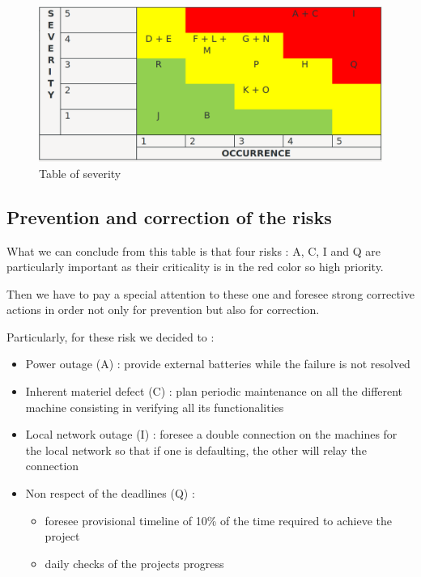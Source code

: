 \begin{figure}[h]
    \centering
    \includegraphics[scale=0.3]{Img/severity.png}
    \caption{Table of severity}
\end{figure}

\subsection{Prevention and correction of the risks}

What we can conclude from this table is that four risks : A, C, I and Q
are particularly important as their criticality is in the red color so
high priority.

Then we have to pay a special attention to these one and foresee strong
corrective actions in order not only for prevention but also for
correction.

Particularly, for these risk we decided to :

\begin{itemize}
\item
  Power outage (A) : provide external batteries while the failure is not
  resolved
\item
  Inherent materiel defect (C) : plan periodic maintenance on all the
  different machine consisting in verifying all its functionalities
\item
  Local network outage (I) : foresee a double connection on the machines
  for the local network so that if one is defaulting, the other will
  relay the connection
\item
  Non respect of the deadlines (Q) :

  \begin{itemize}
  \item
    foresee provisional timeline of 10\% of the time required to achieve
    the project
  \item
    daily checks of the projects progress
  \end{itemize}
\end{itemize}
